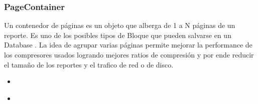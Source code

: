 \documentclass[a4paper,12pt,spanish]{sphinxmanual}
\begin{document}
\label{\detokenize{openerm.PageContainer:pagecontainer}}\label{\detokenize{openerm.PageContainer:module-openerm.PageContainer}}\label{\detokenize{openerm.PageContainer:pagecontainer}}

\subsubsection{PageContainer}
\label{\detokenize{openerm.PageContainer:id1}}\label{\detokenize{openerm.PageContainer::doc}}
Un contenedor de páginas es un objeto que alberga de 1 a N páginas de un reporte. Es
uno de los posibles tipos de Bloque que pueden salvarse en un Database . La
idea de agrupar varias páginas permite mejorar la performance de los compresores usados
logrando mejores ratios de compresión y por ende reducir el tamaño de los reportes y
el trafico de red o de disco.



\begin{itemize}
\item {} 
{\hyperref[\detokenize{openerm.MetadataContainer:module-openerm.MetadataContainer}]{}}

\item {} 
{\hyperref[\detokenize{openerm.PageContainer:module-openerm.PageContainer}]{}}

\end{itemize}


\end{document}

